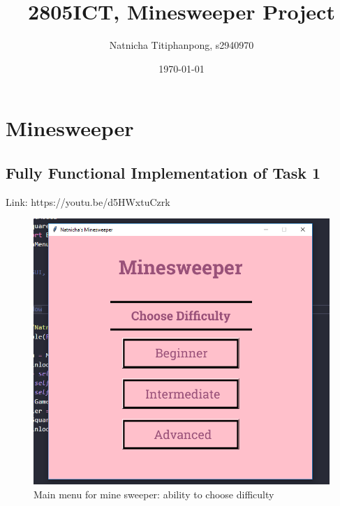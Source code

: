 \documentclass[12pt, a4]{report}
\title{2805ICT, Minesweeper Project}
\author{Natnicha Titiphanpong, s2940970}%
\date{\today}
\begin{document}
\begin{titlepage}
	\maketitle 
\end{titlepage}
	\tableofcontents
	\pagebreak
	\section{Minesweeper} 
	\subsection{Fully Functional Implementation of Task 1}
	Link: https://youtu.be/d5HWxtuCzrk 
		\begin{figure}[!h]
			\centering
			\includegraphics[scale=0.7]{menu}
			\caption{Main menu for mine sweeper: ability to choose difficulty}
		\end{figure}
	
\end{document}
